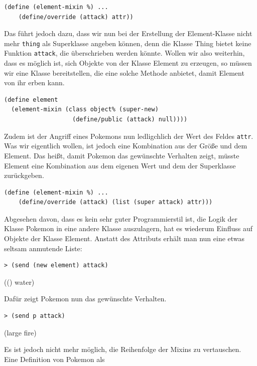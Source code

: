 \begin{lstlisting}
(define (element-mixin %) ...
    (define/override (attack) attr))
\end{lstlisting}

Das führt jedoch dazu, dass wir nun bei der Erstellung der Element-Klasse nicht mehr \texttt{thing} als Superklasse angeben können, denn die Klasse Thing bietet keine Funktion \texttt{attack}, die überschrieben werden könnte. Wollen wir also weiterhin, dass es möglich ist, sich Objekte von der Klasse Element zu erzeugen, so müssen wir eine Klasse bereitstellen, die eine solche Methode anbietet, damit Element von ihr erben kann.

\begin{lstlisting}
(define element 
  (element-mixin (class object% (super-new)
                   (define/public (attack) null))))
\end{lstlisting}

Zudem ist der Angriff eines Pokemons nun ledligchlich der Wert des Feldes \texttt{attr}. 
% 
Was wir eigentlich wollen, ist jedoch eine Kombination aus der Größe und dem Element. Das heißt, damit Pokemon das gewünschte Verhalten zeigt, müsste Element eine Kombination aus dem eigenen Wert und dem der Superklasse zurückgeben.

\begin{lstlisting}
(define (element-mixin %) ...
    (define/override (attack) (list (super attack) attr)))
\end{lstlisting}

Abgesehen davon, dass es kein sehr guter Programmierstil ist, die Logik der Klasse Pokemon in eine andere Klasse auszulagern, hat es wiederum Einfluss auf Objekte der Klasse Element. Anstatt des Attributs erhält man nun eine etwas seltsam anmutende Liste:

\begin{lstlisting}
> (send (new element) attack)
\end{lstlisting}
{\rsymbol (() water)}

Dafür zeigt Pokemon nun das gewünschte Verhalten.
\begin{lstlisting}
> (send p attack)
\end{lstlisting}
{\rsymbol (large fire)}

Es ist jedoch nicht mehr möglich, die Reihenfolge der Mixins zu vertauschen. Eine Definition von Pokemon als

